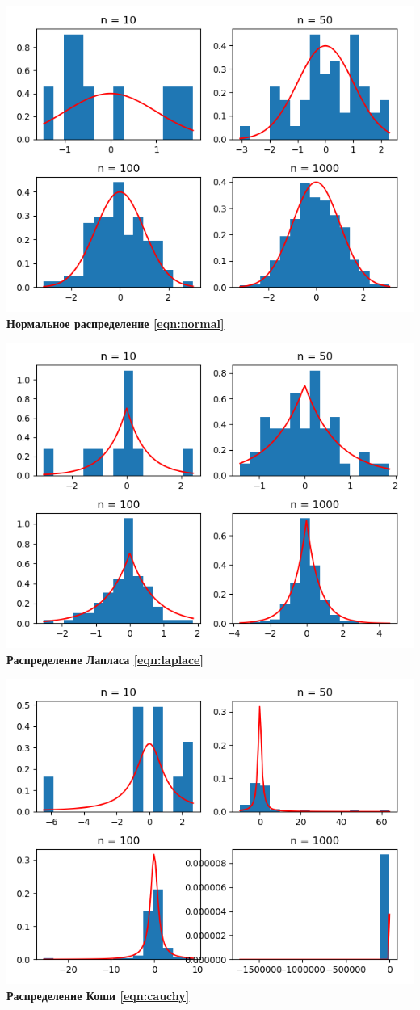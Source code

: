 \documentclass[a4]{article}
\begin{document}
\begin{center}

\includegraphics[width=\textwidth]{distribution_normal.png} \textbf{Нормальное распределение \eqref{eqn:normal}}

\includegraphics[width=\textwidth]{distribution_laplace.png} \textbf{Распределение Лапласа \eqref{eqn:laplace}}

\includegraphics[width=\textwidth]{distribution_cauchy.png} \textbf{Распределение Коши \eqref{eqn:cauchy}}


\end{center}
\end{document}
